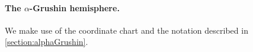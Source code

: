 \documentclass[11pt,twoside,a4paper]{article}
\makeatletter
\DeclarePairedDelimiter\abs{\lvert}{\rvert}%
\let\oldabs\abs
\def\abs{\@ifstar{\oldabs}{\oldabs*}}
\newcommand{\red}{\color{red}}
\newcommand*\diff{\mathop{}\!\mathrm{d}}
\newcommand{\Ric}{\mathrm{Ric}}
\newcommand{\Sbb}{\mathbb{S}}
\renewcommand{\S}{\mathbb{S}}
\theoremstyle{theorem}
\newtheorem{prop}[theorem]{Proposition}
\theoremstyle{definition}
\theoremstyle{remark}
\theoremstyle{proof}
\makeatother
\begin{document}
\paragraph{The $\alpha$-Grushin hemisphere.}
We make use of the coordinate chart and the notation described in \cref{section:alphaGrushin}.


\end{document}
